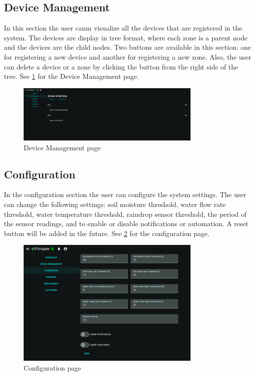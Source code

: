 \subsection{Device Management}
In this section the user canm visualize all the devices that are registered in the system.
The devices are display in tree format, where each zone is a parent node and the devices are the child nodes.
Two buttons are available in this section: one for registering a new device and another for registering a new zone.
Also, the user can delete a device or a zone by clicking the button from the right side of the tree. See \ref{fig:device-management} 
for the Device Management page.
\begin{figure}[H]
    \centering
    \includegraphics[width=0.8\textwidth]{images/device_management.png}
    \caption{Device Management page}
    \label{fig:device-management}
\end{figure}

\subsection {Configuration}
In the configuration section the user can configure the system settings. The user can change the following settings:
soil moisture threshold, water flow rate threshold, water temperature threshold, raindrop sensor threshold, the 
period of the sensor readings, and to enable or disable notifications or automation. A reset button will be added in the future. See 
\ref{fig:configuration-page} for the configuration page.

\begin{figure}[H]
    \centering
    \includegraphics[width=0.8\textwidth]{images/configuration.png}
    \caption{Configuration page}
    \label{fig:configuration-page}
\end{figure}

